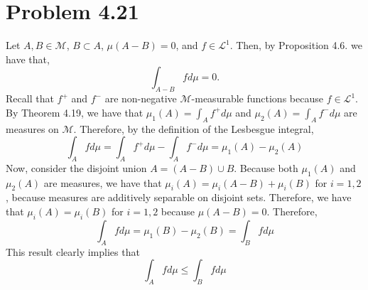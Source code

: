 \documentclass[letterpaper,12pt]{article}
\theoremstyle{definition}
\begin{document}
  \section*{Problem 4.21}
  Let $A, B \in \mathcal{M}$, $B \subset A$, $\mu(A - B) = 0$, and $f \in \mathscr{L}^1$. Then, by Proposition 4.6. we have that,
  \begin{equation*}
    \int_{A-B} f d\mu = 0.
  \end{equation*}
  Recall that $f^+$ and $f^-$ are non-negative $\mathcal{M}$-measurable functions because $f \in \mathscr{L}^1$. By Theorem 4.19, we have that $\mu_1(A) =  \int_A f^+ d\mu$ and $\mu_2(A) = \int_A f^- d\mu$ are measures on $\mathcal{M}$. Therefore, by the definition of the Lesbesgue integral,
  \begin{equation*}
  	\int_A f d\mu =  \int_A f^+ d\mu -  \int_A f^- d\mu = \mu_1(A) - \mu_2(A)
  \end{equation*}
  Now, consider the disjoint union $A = (A - B) \cup B$.  Because both $\mu_1(A)$ and $\mu_2(A)$ are measures, we have that $\mu_i(A) = \mu_i(A - B) + \mu_i(B)$ for $i=1,2$, because measures are additively separable on disjoint sets. Therefore, we have that $\mu_i(A) = \mu_i (B)$ for $i=1,2$ because $\mu(A - B) = 0$. Therefore,
  \begin{equation*}
  	\int_A f d\mu = \mu_1(B) - \mu_2(B) = \int_B f d\mu
  \end{equation*}
  This result clearly implies that
  \begin{equation*}
  	\int_A f d\mu \leq \int_{B} f d\mu
  \end{equation*}
\end{document}
